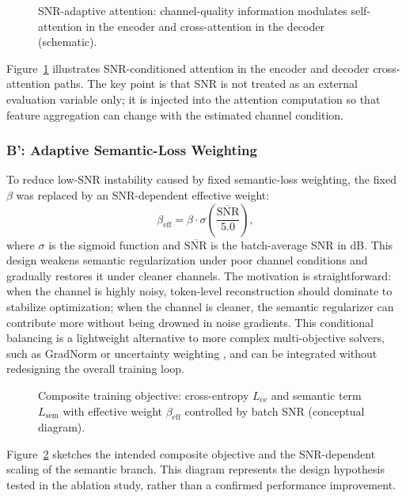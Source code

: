 \begin{figure}[!htb]
\centering
{}
\caption{SNR-adaptive attention: channel-quality information modulates self-attention in the encoder and cross-attention in the decoder (schematic).}
\label{fig:snr_attention}
\end{figure}
Figure~\ref{fig:snr_attention} illustrates SNR-conditioned attention in the encoder and decoder cross-attention paths. The key point is that SNR is not treated as an external evaluation variable only; it is injected into the attention computation so that feature aggregation can change with the estimated channel condition.

\subsubsection{B': Adaptive Semantic-Loss Weighting}

To reduce low-SNR instability caused by fixed semantic-loss weighting, the fixed $\beta$ was replaced by an SNR-dependent effective weight:
\begin{equation}
\beta_{\text{eff}} = \beta \cdot \sigma\!\left(\frac{\overline{\mathrm{SNR}}}{5.0}\right),
\end{equation}
where $\sigma$ is the sigmoid function and $\overline{\mathrm{SNR}}$ is the batch-average SNR in dB. This design weakens semantic regularization under poor channel conditions and gradually restores it under cleaner channels. The motivation is straightforward: when the channel is highly noisy, token-level reconstruction should dominate to stabilize optimization; when the channel is cleaner, the semantic regularizer can contribute more without being drowned in noise gradients. This conditional balancing is a lightweight alternative to more complex multi-objective solvers, such as GradNorm or uncertainty weighting \cite{kendall2018mtl, chen2018gradnorm}, and can be integrated without redesigning the overall training loop.

\begin{figure}[!htb]
\centering
{}
\caption{Composite training objective: cross-entropy $L_{\mathrm{ce}}$ and semantic term $L_{\mathrm{sem}}$ with effective weight $\beta_{\mathrm{eff}}$ controlled by batch SNR (conceptual diagram).}
\label{fig:composite_loss}
\end{figure}
Figure~\ref{fig:composite_loss} sketches the intended composite objective and the SNR-dependent scaling of the semantic branch. This diagram represents the design hypothesis tested in the ablation study, rather than a confirmed performance improvement.

